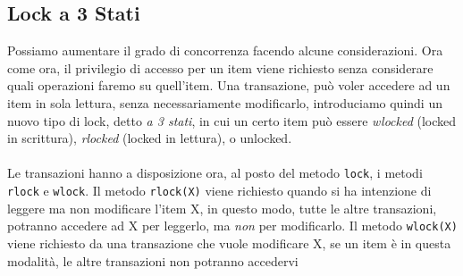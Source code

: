 \documentclass[12pt, letterpaper]{article}
\newcommand{\code}[1]{\colorbox{light-gray}{\texttt{#1}}}
\newcommand{\acc}{\\\hphantom{}\\}
\begin{document}
\subsection{Lock a 3 Stati}
Possiamo aumentare il grado di concorrenza facendo alcune considerazioni. Ora come ora, il privilegio di accesso per un item 
viene richiesto senza considerare quali operazioni faremo su quell'item. Una transazione, può voler 
accedere ad un item in sola lettura, senza necessariamente modificarlo, introduciamo quindi un nuovo tipo di lock, detto 
\textit{a 3 stati}, in cui un certo item può essere \textit{wlocked} (locked in scrittura), \textit{rlocked} (locked in lettura), o unlocked.
\acc Le transazioni hanno a disposizione ora, al posto del metodo \code{lock}, i metodi \code{rlock} e \code{wlock}.  Il metodo 
\code{rlock(X)} viene richiesto quando si ha intenzione di leggere ma non modificare l'item X, in questo modo, tutte le altre 
transazioni, potranno accedere ad X per leggerlo, ma \textit{non} per modificarlo. Il metodo \code{wlock(X)} viene richiesto 
da una transazione che vuole modificare X, se un item è in questa modalità, le altre transazioni non potranno accedervi 
\end{document}
